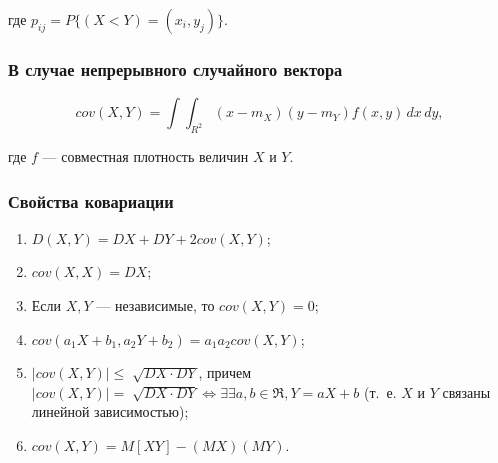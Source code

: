 где $p_{ij} = P\{(X< Y) = (x_{i}, y_{j})\}$.

\subsubsection*{В случае непрерывного случайного вектора}

\begin{equation}
	cov(X, Y) = \int \int_{R^{2}}^{} (x - m_{X})(y - m_{Y})f(x, y)\,dx\,dy,
\end{equation}

где $f$ --- совместная плотность величин $X$ и $Y$.

\subsubsection*{Свойства ковариации}

\begin{enumerate}
	\item $D(X, Y) = DX + DY + 2cov(X, Y)$;
	\item $cov(X, X) = DX$;
	\item Если $X, Y$ --- независимые, то $cov(X, Y) = 0$;
	\item $cov(a_{1}X + b_{1}, a_{2}Y + b_{2}) = a_{1}a_{2}cov(X, Y)$;
	\item $|cov(X, Y)| \leqslant \sqrt[]{DX \cdot DY}$, причем $|cov(X, Y)| = \sqrt[]{DX \cdot DY} \iff \exists \exists a, b \in \Re, Y = aX + b$ (т.~е. $X$ и $Y$ связаны линейной зависимостью);
	\item $cov(X, Y) = M[XY] - (MX)(MY)$.
\end{enumerate}
